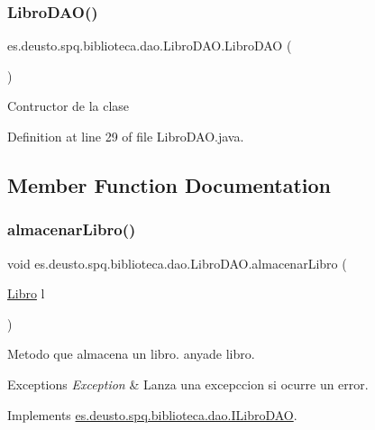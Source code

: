 \subsubsection{\texorpdfstring{Libro\+D\+A\+O()}{LibroDAO()}}
{\footnotesize\ttfamily es.\+deusto.\+spq.\+biblioteca.\+dao.\+Libro\+D\+A\+O.\+Libro\+D\+AO (\begin{DoxyParamCaption}{ }\end{DoxyParamCaption})}

Contructor de la clase 

Definition at line 29 of file Libro\+D\+A\+O.\+java.



\subsection{Member Function Documentation}
\mbox{\label{classes_1_1deusto_1_1spq_1_1biblioteca_1_1dao_1_1_libro_d_a_o_ad2e2db382c6dac9c6ba0ca95d12438ad}} 
\subsubsection{\texorpdfstring{almacenar\+Libro()}{almacenarLibro()}}
{\footnotesize\ttfamily void es.\+deusto.\+spq.\+biblioteca.\+dao.\+Libro\+D\+A\+O.\+almacenar\+Libro (\begin{DoxyParamCaption}\item[{\mbox{\hyperlink{classes_1_1deusto_1_1spq_1_1biblioteca_1_1data_1_1_libro}{Libro}}}]{l }\end{DoxyParamCaption})}

Metodo que almacena un libro.  anyade libro. 
\begin{DoxyExceptions}{Exceptions}
{\em Exception} & Lanza una excepccion si ocurre un error. \\
\hline
\end{DoxyExceptions}


Implements \mbox{\hyperlink{interfacees_1_1deusto_1_1spq_1_1biblioteca_1_1dao_1_1_i_libro_d_a_o_ad8e76a77aa5fc0900142921d7efb79f0}{es.\+deusto.\+spq.\+biblioteca.\+dao.\+I\+Libro\+D\+AO}}.




